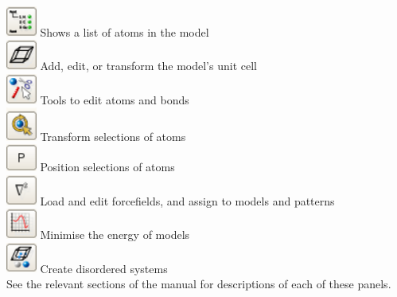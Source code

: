 \noindent
\includegraphics[width=1cm]{images/stack_atomlist} Shows a list of atoms in the model \\
\includegraphics[width=1cm]{images/stack_cell} Add, edit, or transform the model's unit cell \\
\includegraphics[width=1cm]{images/stack_edit} Tools to edit atoms and bonds \\
\includegraphics[width=1cm]{images/stack_transform} Transform selections of atoms \\
\includegraphics[width=1cm]{images/stack_position} Position selections of atoms \\
\includegraphics[width=1cm]{images/stack_ff} Load and edit forcefields, and assign to models and patterns \\
\includegraphics[width=1cm]{images/stack_minimise} Minimise the energy of models \\
\includegraphics[width=1cm]{images/stack_disorder} Create disordered systems \\

See the relevant sections of the manual for descriptions of each of these panels.

